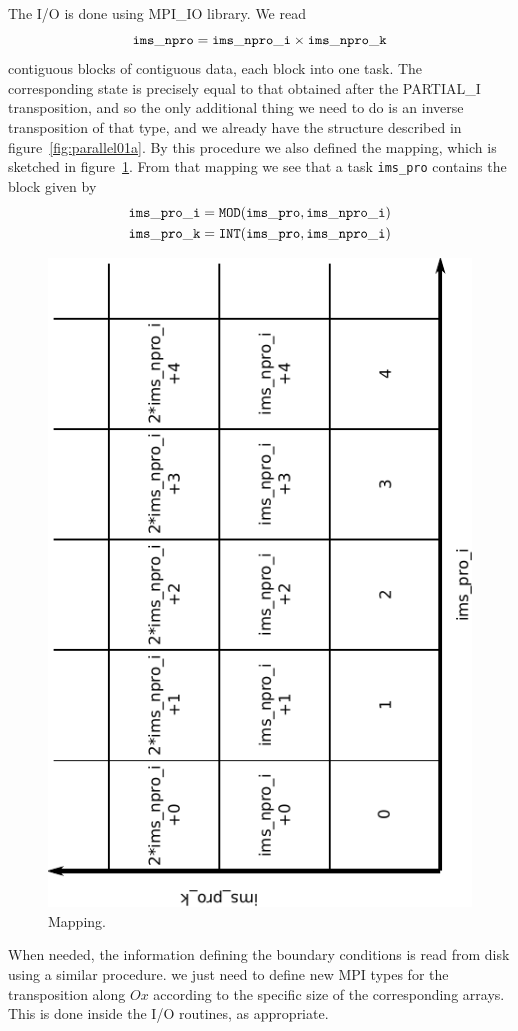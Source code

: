 The I/O is done using MPI\_IO library. We read 
\begin{equation*}
{\tt ims\_npro}={\tt ims\_npro\_i} \times {\tt ims\_npro\_k} 
\end{equation*}
contiguous blocks of contiguous data, each block into one task. The
corresponding state is precisely equal to that obtained after the PARTIAL\_I
transposition, and so the only additional thing we need to do is an inverse
transposition of that type, and we already have the structure described in
figure~\ref{fig:parallel01a}. By this procedure we also defined the mapping,
which is sketched in figure~\ref{fig:parallel02}. From that mapping we see that
a task {\tt ims\_pro} contains the block given by
\begin{eqnarray*}
&{\tt ims\_pro\_i} = {\tt MOD(ims\_pro,ims\_npro\_i)}\\
&{\tt ims\_pro\_k} = {\tt INT(ims\_pro,ims\_npro\_i)}
\end{eqnarray*}

\begin{figure}[!ht]
\begin{centering}
\includegraphics[height=0.6\textwidth,angle=270]{figs/parallel02}
\caption{Mapping.}
\label{fig:parallel02}
\end{centering}
\end{figure}

When needed, the information defining the boundary conditions is read from disk
using a similar procedure. we just need to define new MPI types for the
transposition along $Ox$ according to the specific size of the corresponding
arrays. This is done inside the I/O routines, as appropriate.

